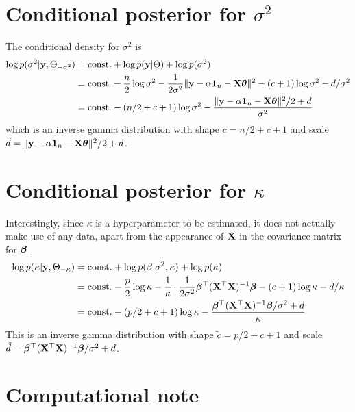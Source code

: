 \section{Conditional posterior for $\sigma^2$}

The conditional density for $\sigma^2$ is
\begin{align*}
  \log p(\sigma^2|\by,\Theta_{-\sigma^2}) 
  &= \const + \log p(\by|\Theta) + \log p(\sigma^2) \\
  &= \const - \half[n]\log\sigma^2 - \frac{1}{2\sigma^2} \Vert \by - \alpha \bone_n - \bX\btheta \Vert^2 - (c+1)\log\sigma^2 - d / \sigma^2 \\
  &= \const - (n/2 + c + 1)\log\sigma^2 - \frac{\Vert \by - \alpha \bone_n - \bX\btheta \Vert^2/2 + d}{\sigma^2}
\end{align*}
which is an inverse gamma distribution with shape $\tilde c = n/2 + c + 1$ and scale $\tilde d = \Vert \by - \alpha \bone_n - \bX\btheta \Vert^2/2 + d$.

\section{Conditional posterior for $\kappa$}

Interestingly, since $\kappa$ is a hyperparameter to be estimated, it does not actually make use of any data, apart from the appearance of $\bX$ in the covariance matrix for $\bbeta$.
\begin{align*}
  \log p(\kappa|\by,\Theta_{-\kappa}) &= \const + \log p(\beta|\sigma^2,\kappa) + \log p(\kappa) \\
  &= \const - \half[p]\log\kappa - \frac{1}{\kappa}\cdot\frac{1}{2\sigma^2} \bbeta^\top(\XTX)^{-1}\bbeta - (c+1)\log\kappa - d / \kappa \\
  &= \const - (p/2+c+1)\log\kappa - \frac{\bbeta^\top(\XTX)^{-1}\bbeta/\sigma^2+d}{\kappa}
\end{align*}
This is an inverse gamma distribution with shape $\tilde c = p/2 + c + 1$ and scale $\tilde d = \bbeta^\top(\XTX)^{-1}\bbeta/\sigma^2+d$.

\section{Computational note}

